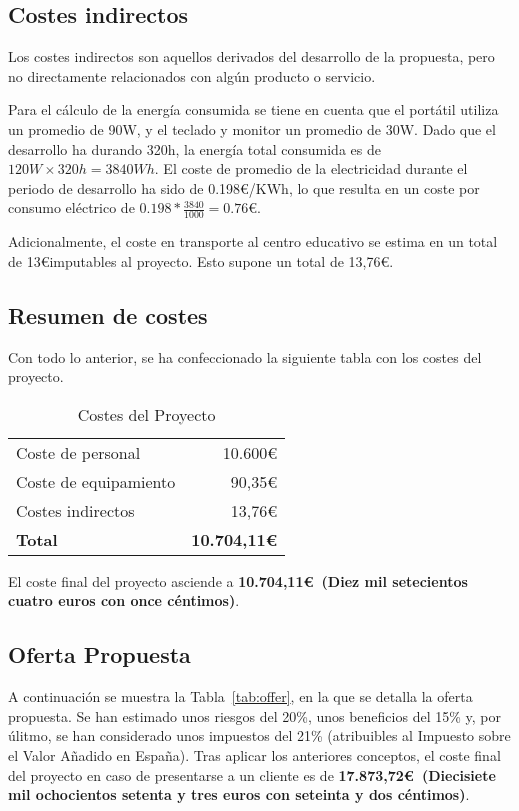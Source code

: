 \subsection{Costes indirectos}\label{subsec:indirect-cost}
Los costes indirectos son aquellos derivados del desarrollo de la propuesta, pero no directamente relacionados con algún producto o servicio.

Para el cálculo de la energía consumida se tiene en cuenta que el portátil utiliza un promedio de 90W, y el teclado y monitor un promedio de 30W. Dado que el desarrollo ha durando 320h, la energía total consumida es de $120W\times 320h = 3840Wh$. El coste de promedio de la electricidad durante el periodo de desarrollo ha sido de 0.198\euro/KWh, lo que resulta en un coste por consumo eléctrico de $0.198*\frac{3840}{1000} = 0.76\euro$.

Adicionalmente, el coste en transporte al centro educativo se estima en un total de 13\euro imputables al proyecto. Esto supone un total de 13,76\euro.

\subsection{Resumen de costes}
Con todo lo anterior, se ha confeccionado la siguiente tabla con los costes del proyecto.

\begin{table}[H]
    \begin{tabular}{@{}lr@{}}
        \toprule
        Coste de personal & 10.600\euro\\
        Coste de equipamiento & 90,35\euro\\
        Costes indirectos & 13,76\euro\\ \midrule
        \textbf{Total} & \textbf{10.704,11\euro}\\
        \bottomrule
    \end{tabular}
    \caption{Costes del Proyecto}\label{tab:resumen-costes}
\end{table}

El coste final del proyecto asciende a \textbf{10.704,11\euro~(Diez mil setecientos cuatro euros con once céntimos)}.

\subsection{Oferta Propuesta}\label{subsec:offer}

A continuación se muestra la Tabla~\ref{tab:offer}, en la que se detalla la oferta propuesta. Se han estimado unos riesgos del 20\%, unos beneficios del 15\% y, por úlitmo, se han considerado unos impuestos del 21\% (atribuibles al Impuesto sobre el Valor Añadido en España). Tras aplicar los anteriores conceptos, el coste final del proyecto en caso de presentarse a un cliente es de \textbf{17.873,72\euro~(Diecisiete mil ochocientos setenta y tres euros con seteinta y dos céntimos)}.

